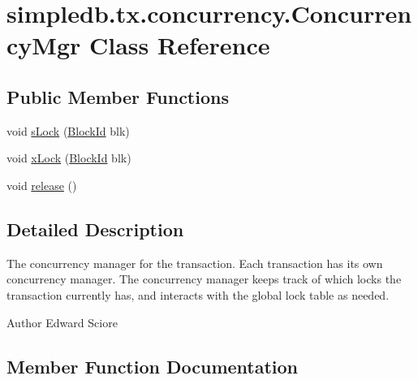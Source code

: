 \hypertarget{classsimpledb_1_1tx_1_1concurrency_1_1ConcurrencyMgr}{}\section{simpledb.\+tx.\+concurrency.\+Concurrency\+Mgr Class Reference}
\label{classsimpledb_1_1tx_1_1concurrency_1_1ConcurrencyMgr}
\subsection*{Public Member Functions}
\begin{DoxyCompactItemize}
\item 
void \hyperlink{classsimpledb_1_1tx_1_1concurrency_1_1ConcurrencyMgr_abf21a565749b8a624c69a304beff2038}{s\+Lock} (\hyperlink{classsimpledb_1_1file_1_1BlockId}{Block\+Id} blk)
\item 
void \hyperlink{classsimpledb_1_1tx_1_1concurrency_1_1ConcurrencyMgr_af92234d0ce20f0913bd6306026969055}{x\+Lock} (\hyperlink{classsimpledb_1_1file_1_1BlockId}{Block\+Id} blk)
\item 
void \hyperlink{classsimpledb_1_1tx_1_1concurrency_1_1ConcurrencyMgr_ae5a41ee9c3b02efed425d621ac7be025}{release} ()
\end{DoxyCompactItemize}


\subsection{Detailed Description}
The concurrency manager for the transaction. Each transaction has its own concurrency manager. The concurrency manager keeps track of which locks the transaction currently has, and interacts with the global lock table as needed. \begin{DoxyAuthor}{Author}
Edward Sciore 
\end{DoxyAuthor}


\subsection{Member Function Documentation}
\mbox{\label{classsimpledb_1_1tx_1_1concurrency_1_1ConcurrencyMgr_ae5a41ee9c3b02efed425d621ac7be025}} 
